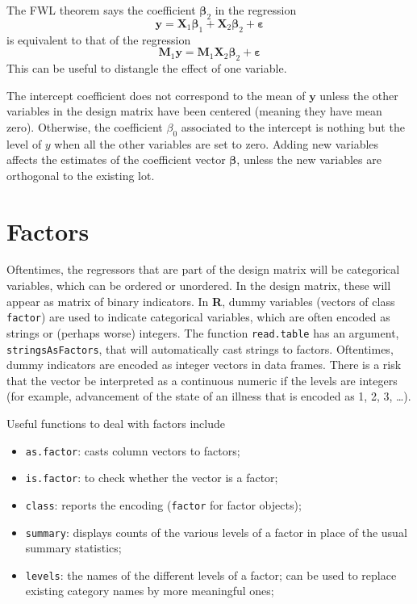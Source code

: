 \documentclass[]{book}
\providecommand{\tightlist}{%
  \setlength{\itemsep}{0pt}\setlength{\parskip}{0pt}}
\theoremstyle{definition}
\theoremstyle{definition}
\theoremstyle{definition}
\theoremstyle{remark}
\begin{document}
The FWL theorem says the coefficient \(\boldsymbol{\beta}_2\) in the
regression
\[\boldsymbol{y} =\mathbf{X}_1\boldsymbol{\beta}_1 + \mathbf{X}_2\boldsymbol{\beta}_2 + \boldsymbol{\varepsilon}\]
is equivalent to that of the regression
\[\mathbf{M}_1\boldsymbol{y} =\mathbf{M}_1 \mathbf{X}_2\boldsymbol{\beta}_2 + \boldsymbol{\varepsilon} \]
This can be useful to distangle the effect of one variable.

The intercept coefficient does not correspond to the mean of
\(\boldsymbol{y}\) unless the other variables in the design matrix have
been centered (meaning they have mean zero). Otherwise, the coefficient
\(\beta_0\) associated to the intercept is nothing but the level of
\(y\) when all the other variables are set to zero. Adding new variables
affects the estimates of the coefficient vector \(\boldsymbol{\beta}\),
unless the new variables are orthogonal to the existing lot.

\hypertarget{factors}{%
\section{Factors}\label{factors}}

Oftentimes, the regressors that are part of the design matrix will be
categorical variables, which can be ordered or unordered. In the design
matrix, these will appear as matrix of binary indicators. In \textbf{R},
dummy variables (vectors of class \texttt{factor}) are used to indicate
categorical variables, which are often encoded as strings or (perhaps
worse) integers. The function \texttt{read.table} has an argument,
\texttt{stringsAsFactors}, that will automatically cast strings to
factors. Oftentimes, dummy indicators are encoded as integer vectors in
data frames. There is a risk that the vector be interpreted as a
continuous numeric if the levels are integers (for example, advancement
of the state of an illness that is encoded as 1, 2, 3, \ldots).

Useful functions to deal with factors include

\begin{itemize}
\tightlist
\item
  \texttt{as.factor}: casts column vectors to factors;\\
\item
  \texttt{is.factor}: to check whether the vector is a factor;
\item
  \texttt{class}: reports the encoding (\texttt{factor} for factor
  objects);
\item
  \texttt{summary}: displays counts of the various levels of a factor in
  place of the usual summary statistics;
\item
  \texttt{levels}: the names of the different levels of a factor; can be
  used to replace existing category names by more meaningful ones;
\end{itemize}
\end{document}
